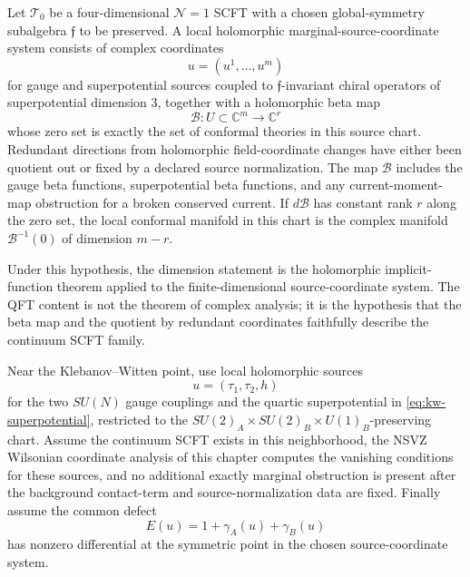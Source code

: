 \begin{hypothesis}[Local \(\mathcal N=1\) exact-marginality chart]
\label{hyp:n1-local-exact-marginality-chart}
Let \(\mathcal T_0\) be a four-dimensional \(\mathcal N=1\) SCFT with a
chosen global-symmetry subalgebra \(\mathfrak f\) to be preserved.  A local
holomorphic marginal-source-coordinate system consists of complex coordinates
\[
  u=(u^1,\ldots,u^m)
\]
for gauge and superpotential sources coupled to \(\mathfrak f\)-invariant
chiral operators of superpotential dimension \(3\), together with a
holomorphic beta map
\[
  \mathcal B:U\subset\mathbb C^m\longrightarrow\mathbb C^r
\]
whose zero set is exactly the set of conformal theories in this source
chart.  Redundant directions from holomorphic field-coordinate changes have
either been quotient out or fixed by a declared source normalization.  The
map \(\mathcal B\) includes the gauge beta functions, superpotential beta
functions, and any current-moment-map obstruction for a broken conserved
current.  If \(d\mathcal B\) has constant rank \(r\) along the zero set, the
local conformal manifold in this chart is the complex manifold
\(\mathcal B^{-1}(0)\) of dimension \(m-r\).
\end{hypothesis}

Under this hypothesis, the dimension statement is the holomorphic
implicit-function theorem applied to the finite-dimensional source-coordinate system.
The QFT content is not the theorem of complex analysis; it is the hypothesis
that the beta map and the quotient by redundant coordinates faithfully
describe the continuum SCFT family.

\begin{hypothesis}
\label{hyp:kw-exact-marginality-input}
Near the Klebanov--Witten point, use local holomorphic sources
\[
  u=(\tau_1,\tau_2,h)
\]
for the two \(SU(N)\) gauge couplings and the quartic superpotential in
\eqref{eq:kw-superpotential}, restricted to the
\(SU(2)_A\times SU(2)_B\times U(1)_B\)-preserving chart.  Assume the
continuum SCFT exists in this neighborhood, the NSVZ Wilsonian coordinate
analysis of this chapter computes the vanishing conditions for these sources,
and no additional exactly marginal obstruction is present after the
background contact-term and source-normalization data are fixed.  Finally
assume the common defect
\[
  E(u)=1+\gamma_A(u)+\gamma_B(u)
\]
has nonzero differential at the symmetric point in the chosen source-coordinate system.
\end{hypothesis}

